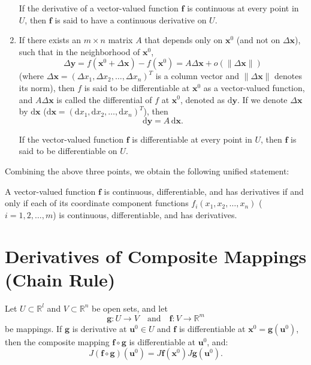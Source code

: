 \documentclass[11pt]{../../TexTemplate/elegantbook}
\begin{document}
\begin{enumerate}
        If the derivative of a vector-valued function $\mathbf{f}$ is continuous at every point in $U$, 
        then $\mathbf{f}$ is said to have a continuous derivative on $U$.
    \item  If there exists an $m \times n$ matrix $A$ that depends only on $\mathbf{x}^0$ (and not on $\Delta \mathbf{x}$), 
        such that in the neighborhood of $\mathbf{x}^0$,
        \[
        \Delta \mathbf{y} = f(\mathbf{x}^0 + \Delta \mathbf{x}) - f(\mathbf{x}^0) = A \Delta \mathbf{x} + o(\|\Delta \mathbf{x}\|)
        \]
        (where $\Delta \mathbf{x} = (\Delta x_1, \Delta x_2, \dots, \Delta x_n)^T$ is a column vector and 
        $\|\Delta \mathbf{x}\|$ denotes its norm), 
        then $f$ is said to be differentiable at $\mathbf{x}^0$ as a vector-valued function, 
        and $A\Delta \mathbf{x}$ is called the differential of $f$ at $\mathbf{x}^0$, denoted as $\mathrm{d}\mathbf{y}$. 
        If we denote $\Delta \mathbf{x}$ by 
        $\mathrm{d}\mathbf{x}$ ($\mathrm{d}\mathbf{x} = (\mathrm{d}x_1, \mathrm{d}x_2, \dots, \mathrm{d}x_n)^T$), then
        \[
            \mathrm{d}\mathbf{y} = A\,\mathrm{d}\mathbf{x}.
        \]

        If the vector-valued function $\mathbf{f}$ is differentiable at every point in $U$, 
        then $\mathbf{f}$ is said to be differentiable on $U$.
\end{enumerate}

Combining the above three points, we obtain the following unified statement:

A vector-valued function \(\mathbf{f}\) is continuous, differentiable, 
and has derivatives if and only if each of its coordinate component functions 
\(f_i(x_1, x_2, \dots, x_n)\) (\(i = 1, 2, \dots, m\)) is continuous, differentiable, and has derivatives.


\section{Derivatives of Composite Mappings (Chain Rule)}
Let \( U \subset \mathbb{R}^l \) and \( V \subset \mathbb{R}^n \) be open sets, and let 
\[
\mathbf{g}: U \to V \quad \text{and} \quad \mathbf{f}: V \to \mathbb{R}^m
\]
be mappings. If \( \mathbf{g} \) is derivative at \( \mathbf{u}^{0} \in U \) 
and \( \mathbf{f} \) is differentiable at \( \mathbf{x}^{0} = \mathbf{g}(\mathbf{u}^{0}) \), 
then the composite mapping \( \mathbf{f} \circ \mathbf{g} \) is differentiable at \( \mathbf{u}^{0} \), and:
\[
J(\mathbf{f} \circ \mathbf{g})(\mathbf{u}^{0}) = 
J\mathbf{f}(\mathbf{x}^{0}) J\mathbf{g}(\mathbf{u}^{0}).
\]
\end{document}
